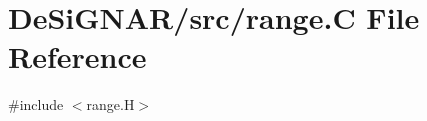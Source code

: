 \hypertarget{range_8_c}{}\section{De\+Si\+G\+N\+A\+R/src/range.C File Reference}
\label{range_8_c}
{\ttfamily \#include $<$range.\+H$>$}\newline

